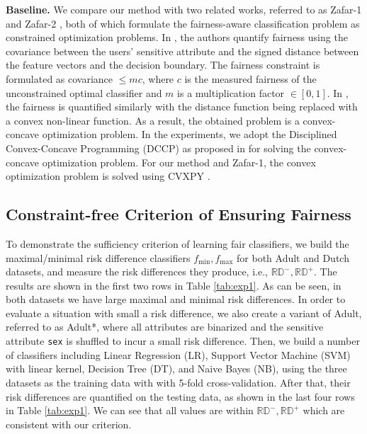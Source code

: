 \documentclass[letterpaper]{article} %
\newcommand{\RD}{\mathbb{RD}}
\begin{document}
	{\bf Baseline.} We compare our method with two related works, referred to as Zafar-1 \cite{Zafar2017a} and Zafar-2 \cite{Zafar2017b}, both of which formulate the fairness-aware classification problem as constrained optimization problems. In \cite{Zafar2017a}, the authors quantify fairness using the covariance between the users' sensitive attribute and the signed distance between the feature vectors and the decision boundary. The fairness constraint is formulated as covariance $\leq mc$, where $c$ is the measured fairness of the unconstrained optimal classifier and $m$ is a multiplication factor $\in [0,1]$. In \cite{Zafar2017b}, the fairness is quantified similarly with the distance function being replaced with a convex non-linear function. As a result, the obtained problem is a convex-concave optimization problem. In the experiments, we adopt the Disciplined Convex-Concave Programming (DCCP) \cite{Shen2016} as proposed in \cite{Zafar2017b} for solving the convex-concave optimization problem. For our method and Zafar-1, the convex optimization problem is solved using CVXPY \cite{StevenDiamond2016}.

\subsection{Constraint-free Criterion of Ensuring Fairness}
To demonstrate the sufficiency criterion of learning fair classifiers, we build the maximal/minimal risk difference classifiers $f_{\min},f_{\max}$ for both Adult and Dutch datasets, and measure the risk differences they produce, i.e., $\RD^{-},\RD^{+}$. The results are shown in the first two rows in Table \ref{tab:exp1}. As can be seen, in both datasets we have large maximal and minimal risk differences. In order to evaluate a situation with small a risk difference, we also create a variant of Adult, referred to as Adult*, where all attributes are binarized and the sensitive attribute \texttt{sex} is shuffled to incur a small risk difference. Then, we build a number of classifiers including Linear Regression (LR), Support Vector Machine (SVM) with linear kernel, Decision Tree (DT), and Naive Bayes (NB), using the three datasets as the training data with with 5-fold cross-validation. After that, their risk differences are quantified on the testing data, as shown in the last four rows in Table \ref{tab:exp1}. We can see that all values are within $\RD^{-},\RD^{+}$ which are consistent with our criterion.
\end{document}
